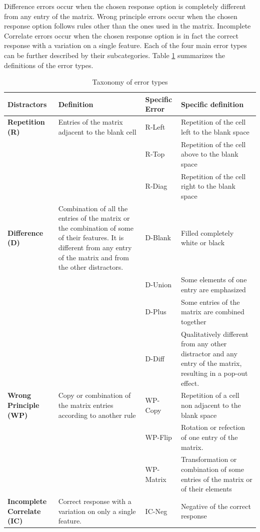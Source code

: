 Difference errors occur when the chosen response option is completely different from any entry of the matrix.
Wrong principle errors occur when the chosen response option follows rules other than the ones used in the matrix. Incomplete Correlate errors occur when the chosen response option is in fact the correct response with a variation on a single feature.
Each of the four main error types can be further described by their subcategories.
Table \ref{tab:tab-error-types-static} summarizes the definitions of the error types.

\begin{table}

\caption{\label{tab:tab-error-types-static}Taxonomy of error types}
\centering
\begin{tabular}[t]{>{}l|l|l|l}
\hline
Distractors & Definition & Specific Error & Specific definition\\
\hline
\textbf{Repetition (R)} & Entries of the matrix adjacent to the blank cell & R-Left & Repetition of the cell left to the blank space\\
\hline
\textbf{} &  & R-Top & Repetition of the cell above to the blank space\\
\hline
\textbf{} &  & R-Diag & Repetition of the cell right to the blank space\\
\hline
\textbf{Difference (D)} & Combination of all the entries of the matrix or the combination of some of their features. It is different from any entry of the matrix and from the other distractors. & D-Blank & Filled completely white or black\\
\hline
\textbf{} &  & D-Union & Some elements of one entry are emphasized\\
\hline
\textbf{} &  & D-Plus & Some entries of the matrix are combined together\\
\hline
\textbf{} &  & D-Diff & Qualitatively different from any other distractor and any entry of the matrix, resulting in a pop-out effect.\\
\hline
\textbf{Wrong Principle (WP)} & Copy or combination of the matrix entries according to another rule & WP-Copy & Repetition of a cell non adjacent to the blank space\\
\hline
\textbf{} &  & WP-Flip & Rotation or refection of one entry of the matrix.\\
\hline
\textbf{} &  & WP-Matrix & Transformation or combination of some entries of the matrix or of their elements\\
\hline
\textbf{Incomplete Correlate (IC)} & Correct response with a variation on only a single feature. & IC-Neg & Negative of the correct response\\

\end{tabular}
\end{table}
